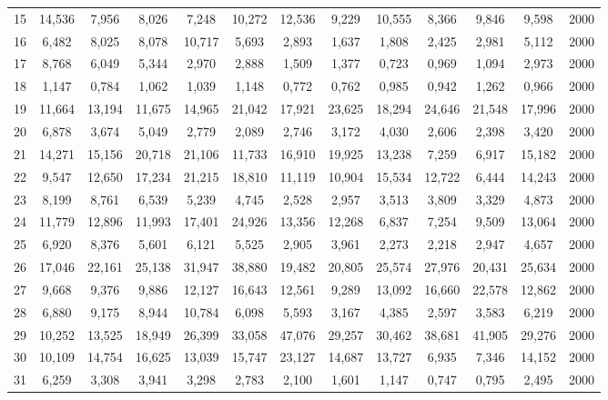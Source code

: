 {\begin{longtable}{ >{\footnotesize}ccccccccccccc}
15  & 14,536 & 7,956  & 8,026  & 7,248  & 10,272 & 12,536 & 9,229  & 10,555 & 8,366  & 9,846  & 9,598  & 2000 \\
16  & 6,482  & 8,025  & 8,078  & 10,717 & 5,693  & 2,893  & 1,637  & 1,808  & 2,425  & 2,981  & 5,112  & 2000 \\
17  & 8,768  & 6,049  & 5,344  & 2,970  & 2,888  & 1,509  & 1,377  & 0,723  & 0,969  & 1,094  & 2,973  & 2000 \\
18  & 1,147  & 0,784  & 1,062  & 1,039  & 1,148  & 0,772  & 0,762  & 0,985  & 0,942  & 1,262  & 0,966  & 2000 \\
19  & 11,664 & 13,194 & 11,675 & 14,965 & 21,042 & 17,921 & 23,625 & 18,294 & 24,646 & 21,548 & 17,996 & 2000 \\
20  & 6,878  & 3,674  & 5,049  & 2,779  & 2,089  & 2,746  & 3,172  & 4,030  & 2,606  & 2,398  & 3,420  & 2000 \\
21  & 14,271 & 15,156 & 20,718 & 21,106 & 11,733 & 16,910 & 19,925 & 13,238 & 7,259  & 6,917  & 15,182 & 2000 \\
22  & 9,547  & 12,650 & 17,234 & 21,215 & 18,810 & 11,119 & 10,904 & 15,534 & 12,722 & 6,444  & 14,243 & 2000 \\
23  & 8,199  & 8,761  & 6,539  & 5,239  & 4,745  & 2,528  & 2,957  & 3,513  & 3,809  & 3,329  & 4,873  & 2000 \\
24  & 11,779 & 12,896 & 11,993 & 17,401 & 24,926 & 13,356 & 12,268 & 6,837  & 7,254  & 9,509  & 13,064 & 2000 \\
25  & 6,920  & 8,376  & 5,601  & 6,121  & 5,525  & 2,905  & 3,961  & 2,273  & 2,218  & 2,947  & 4,657  & 2000 \\
26  & 17,046 & 22,161 & 25,138 & 31,947 & 38,880 & 19,482 & 20,805 & 25,574 & 27,976 & 20,431 & 25,634 & 2000 \\
27  & 9,668  & 9,376  & 9,886  & 12,127 & 16,643 & 12,561 & 9,289  & 13,092 & 16,660 & 22,578 & 12,862 & 2000 \\
28  & 6,880  & 9,175  & 8,944  & 10,784 & 6,098  & 5,593  & 3,167  & 4,385  & 2,597  & 3,583  & 6,219  & 2000 \\
29  & 10,252 & 13,525 & 18,949 & 26,399 & 33,058 & 47,076 & 29,257 & 30,462 & 38,681 & 41,905 & 29,276 & 2000 \\
30  & 10,109 & 14,754 & 16,625 & 13,039 & 15,747 & 23,127 & 14,687 & 13,727 & 6,935  & 7,346  & 14,152 & 2000 \\
31  & 6,259  & 3,308  & 3,941  & 3,298  & 2,783  & 2,100  & 1,601  & 1,147  & 0,747  & 0,795  & 2,495  & 2000 \\

\end{longtable}}
